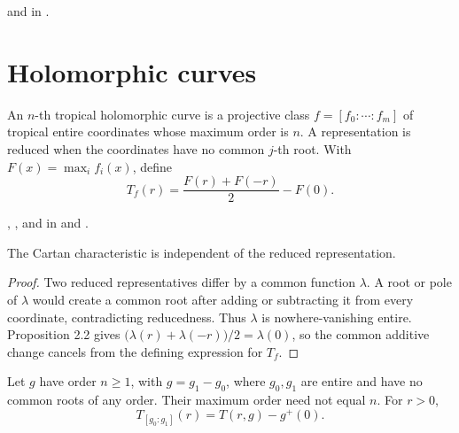 \begin{leanproof}
 and
 in .
\end{leanproof}

\section{Holomorphic curves}

\begin{definition}
\leanok
{}
An $n$-th tropical holomorphic curve is a projective class
$f=[f_0:\cdots:f_m]$ of tropical entire coordinates whose maximum order is
$n$.  A representation is reduced when the coordinates have no common
$j$-th root.  With $F(x)=\max_i f_i(x)$, define
\[
                  T_f(r)=\frac{F(r)+F(-r)}2-F(0).
\]
\end{definition}

\begin{leanproof}
,
, and  in
 and .
\end{leanproof}

\begin{proposition}
\leanok
{}
The Cartan characteristic is independent of the reduced representation.
\end{proposition}

\begin{proof}
\leanok
Two reduced representatives differ by a common function $\lambda$.  A root
or pole of $\lambda$ would create a common root after adding or subtracting
it from every coordinate, contradicting reducedness.  Thus $\lambda$ is
nowhere-vanishing entire.  Proposition 2.2 gives
$\bigl(\lambda(r)+\lambda(-r)\bigr)/2=\lambda(0)$, so the common additive
change cancels from the defining expression for $T_f$.
\end{proof}

\begin{proposition}
\leanok
{}
Let $g$ have order $n\geq1$, with $g=g_1-g_0$, where $g_0,g_1$ are entire
and have no common roots of any order.  Their maximum order need not equal
$n$.  For $r>0$,
\[
 T_{[g_0:g_1]}(r)=T(r,g)-g^+(0).
\]
\end{proposition}

